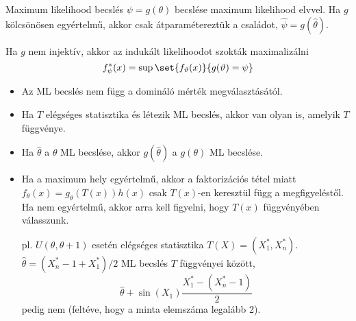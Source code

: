 \documentclass[aspectratio=169,notheorems,9pt,\option]{beamer}
\begin{document}
  \begin{frame}{Maximum likelihood becslés}
    $\psi=g(\theta)$ becslése maximum likelihood elvvel. Ha $g$ kölcsönösen
    egyértelmű, akkor csak átparamétereztük a családot,
    $\hat\psi=g(\hat\theta)$.
  
    Ha $g$ nem injektív, akkor az indukált likelihoodot szokták
    maximalizálni
    \begin{displaymath}
      f^*_\psi (x)=\sup\set{f_\theta (x)}{g (\theta)=\psi}
    \end{displaymath}
  
    \begin{proposition}
      \begin{itemize}[<*>]
      \item Az ML becslés nem függ a domináló mérték megválasztásától.
      \item Ha $T$ elégséges statisztika és létezik ML becslés, akkor
        van olyan is, amelyik $T$ függvénye.
      \item Ha $\hat\theta$ a $\theta$ ML becslése, akkor $g
        (\hat\theta)$ a $g (\theta)$ ML becslése.
      \end{itemize}
    \end{proposition}
    \begin{itemize}
    \item Ha a maximum hely egyértelmű, akkor a faktorizációs tétel
      miatt $f_\theta (x)=g_\theta (T (x)) h (x)$ csak $T (x)$-en
      keresztül függ a megfigyeléstől. Ha nem egyértelmű, akkor arra
      kell figyelni, hogy $T (x)$ függvényében válasszunk.
      
      pl. $U (\theta,\theta+1)$ esetén elégséges statisztika
      $T (X) =(X_1^*,X_n^*)$. $\hat\theta=(X_n^*-1+X_1^*)/2$ ML becslés $T$
      függvényei között,
      \begin{displaymath}
        \hat\theta+\sin (X_1)\frac{X_1^*-(X_n^*-1)}2
      \end{displaymath}
      pedig nem (feltéve, hogy a minta elemszáma legalább 2).
    \end{itemize}  
  \end{frame}
  
\end{document}
